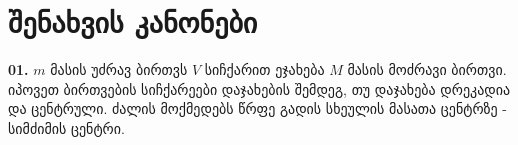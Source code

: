 \documentclass[a4paper]{book}
\begin{document}
 
    

 

        

 



 


 

 

 

 




 

 

 

 



 



	\section{შენახვის კანონები}
	\textbf{01.} $m$ მასის უძრავ ბირთვს $V$ სიჩქარით ეჯახება $M$ მასის მოძრავი ბირთვი. იპოვეთ ბირთვების სიჩქარეები დაჯახების შემდეგ, თუ დაჯახება დრეკადია და ცენტრული. ძალის მოქმედებს წრფე გადის სხეულის მასათა ცენტრზე - სიმძიმის ცენტრი.
		
\end{document}
